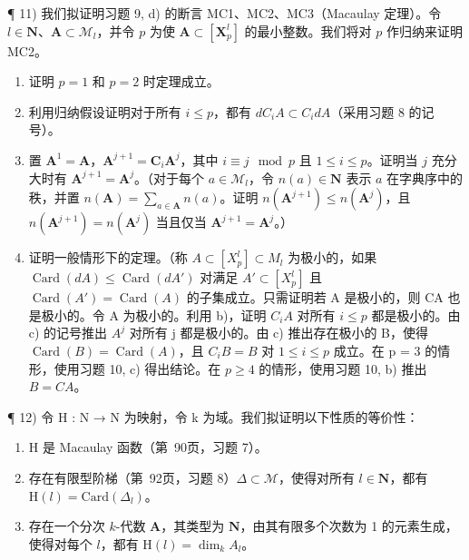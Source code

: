 ¶ 11) 我们拟证明习题 9, d) 的断言 MC1、MC2、MC3（Macaulay 定理）。令 \(l \in \mathbf{N}\)、\(\mathbf{A} \subset \mathcal{M}_l\)，并令 \(p\) 为使 \(\mathbf{A} \subset [\mathbf{X}_p^l]\) 的最小整数。我们将对 \(p\) 作归纳来证明 MC2。

\begin{enumerate}
\def\labelenumi{\alph{enumi})}
\item
  证明 \(p = 1\) 和 \(p = 2\) 时定理成立。
\item
  利用归纳假设证明对于所有 \(i \leqslant p\)，都有 \(dC_{i}A \subset C_{i}dA\)（采用习题 8 的记号）。
\item
  置 \(\mathbf{A}^1 = \mathbf{A}\)，\(\mathbf{A}^{j+1} = \mathbf{C}_i\mathbf{A}^j\)，其中 \(i \equiv j \mod p\) 且 \(1 \leqslant i \leqslant p\)。证明当 \(j\) 充分大时有 \(\mathbf{A}^{j+1} = \mathbf{A}^j\)。（对于每个 \(a \in \mathcal{M}_l\)，令 \(n(a) \in \mathbf{N}\) 表示 \(a\) 在字典序中的秩，并置 \(n(\mathbf{A}) = \sum_{a \in \mathbf{A}} n(a)\)。证明 \(n(\mathbf{A}^{j+1}) \leqslant n(\mathbf{A}^j)\)，且 \(n(\mathbf{A}^{j+1}) = n(\mathbf{A}^j)\) 当且仅当 \(\mathbf{A}^{j+1} = \mathbf{A}^j\)。）
\item
  证明一般情形下的定理。（称 \(A \subset [X_{p}^{l}] \subset M_{l}\) 为极小的，如果 \(\operatorname{Card}(dA) \leqslant \operatorname{Card}(dA')\) 对满足 \(A' \subset [X_{p}^{l}]\) 且 \(\operatorname{Card}(A') = \operatorname{Card}(A)\) 的子集成立。只需证明若 A 是极小的，则 CA 也是极小的。令 A 为极小的。利用 b)，证明 \(C_{i}A\) 对所有 \(i \leqslant p\) 都是极小的。由 c) 的记号推出 \(A^{j}\) 对所有 j 都是极小的。由 c) 推出存在极小的 B，使得 \(\operatorname{Card}(B) = \operatorname{Card}(A)\)，且 \(C_{i}B = B\) 对 \(1 \leqslant i \leqslant p\) 成立。在 p = 3 的情形，使用习题 10, c) 得出结论。在 \(p \geqslant 4\) 的情形，使用习题 10, b) 推出 \(B = CA\)。
\end{enumerate}

¶ 12) 令 H : N → N 为映射，令 k 为域。我们拟证明以下性质的等价性：

\begin{enumerate}
\def\labelenumi{(\roman{enumi})}
\item
  H 是 Macaulay 函数（第~90页，习题 7）。
\item
  存在有限型阶梯（第~92页，习题 8）\(\Delta \subset \mathcal{M}\)，使得对所有 \(l \in \mathbf{N}\)，都有 \(\mathrm{H}(l) = \mathrm{Card}(\Delta_l)\)。
\item
  存在一个分次 \(k\)-代数 \(\mathbf{A}\)，其类型为 \(\mathbf{N}\)，由其有限多个次数为 1 的元素生成，使得对每个 \(l\)，都有 \(\mathrm{H}(l) = \dim_k A_l\)。
\end{enumerate}

